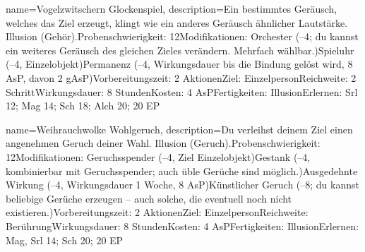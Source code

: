 {
    name={Vogelzwitschern Glockenspiel},
    description={Ein bestimmtes Geräusch, welches das Ziel erzeugt, klingt wie ein anderes Geräusch ähnlicher Lautstärke. Illusion (Gehör).\newline Probenschwierigkeit: 12\newline Modifikationen: Orchester (–4; du kannst ein weiteres Geräusch des gleichen Zieles verändern. Mehrfach wählbar.)\newline Spieluhr (–4, Einzelobjekt)\newline Permanenz (–4, Wirkungsdauer bis die Bindung gelöst wird, 8 AsP, davon 2 gAsP)\newline Vorbereitungszeit: 2 Aktionen\newline Ziel: Einzelperson\newline Reichweite: 2 Schritt\newline Wirkungsdauer: 8 Stunden\newline Kosten: 4 AsP\newline Fertigkeiten: Illusion\newline Erlernen: Srl 12; Mag 14; Sch 18; Alch 20; 20 EP}
}


{
    name={Weihrauchwolke Wohlgeruch},
    description={Du verleihst deinem Ziel einen angenehmen Geruch deiner Wahl. Illusion (Geruch).\newline Probenschwierigkeit: 12\newline Modifikationen: Geruchsspender (–4, Ziel Einzelobjekt)\newline Gestank (–4, kombinierbar mit Geruchsspender; auch üble Gerüche sind möglich.)\newline Ausgedehnte Wirkung (–4, Wirkungsdauer 1 Woche, 8 AsP)\newline Künstlicher Geruch (–8; du kannst beliebige Gerüche erzeugen – auch solche, die eventuell noch nicht existieren.)\newline Vorbereitungszeit: 2 Aktionen\newline Ziel: Einzelperson\newline Reichweite: Berührung\newline Wirkungsdauer: 8 Stunden\newline Kosten: 4 AsP\newline Fertigkeiten: Illusion\newline Erlernen: Mag, Srl 14; Sch 20; 20 EP}
}


